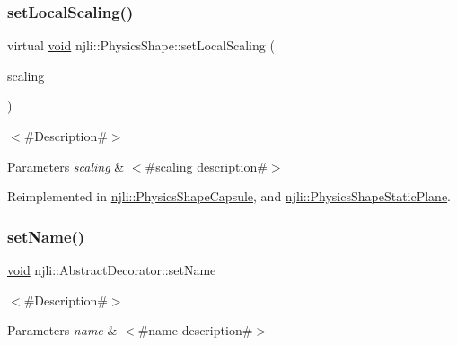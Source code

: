 \subsubsection{\texorpdfstring{set\+Local\+Scaling()}{setLocalScaling()}}
{\footnotesize\ttfamily virtual \mbox{\hyperlink{_thread_8h_af1e856da2e658414cb2456cb6f7ebc66}{void}} njli\+::\+Physics\+Shape\+::set\+Local\+Scaling (\begin{DoxyParamCaption}\item[{const bt\+Vector3 \&}]{scaling }\end{DoxyParamCaption})\hspace{0.3cm}{\ttfamily [virtual]}}

$<$\#\+Description\#$>$


\begin{DoxyParams}{Parameters}
{\em scaling} & $<$\#scaling description\#$>$ \\
\hline
\end{DoxyParams}


Reimplemented in \mbox{\hyperlink{classnjli_1_1_physics_shape_capsule_aced243d46142c8680d87e2cf4fbfc5f7}{njli\+::\+Physics\+Shape\+Capsule}}, and \mbox{\hyperlink{classnjli_1_1_physics_shape_static_plane_a2f6934822e6cfe1e4653809231fb4218}{njli\+::\+Physics\+Shape\+Static\+Plane}}.

\mbox{\label{classnjli_1_1_physics_shape_a087eb5f8d9f51cc476f12f1d10a3cb95}} 
\subsubsection{\texorpdfstring{set\+Name()}{setName()}}
{\footnotesize\ttfamily \mbox{\hyperlink{_thread_8h_af1e856da2e658414cb2456cb6f7ebc66}{void}} njli\+::\+Abstract\+Decorator\+::set\+Name}

$<$\#\+Description\#$>$


\begin{DoxyParams}{Parameters}
{\em name} & $<$\#name description\#$>$ \\
\hline
\end{DoxyParams}
\mbox{\label{classnjli_1_1_physics_shape_a2d21f55f6e742bddb5b5fc44223f96fb}} 
